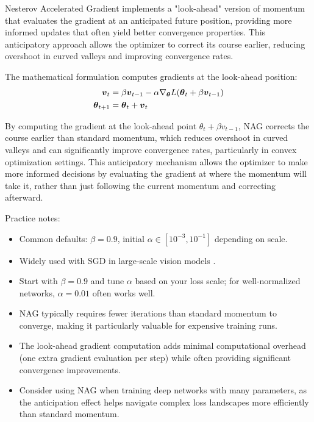 Nesterov Accelerated Gradient implements a "look-ahead" version of momentum that evaluates the gradient at an anticipated future position, providing more informed updates that often yield better convergence properties. This anticipatory approach allows the optimizer to correct its course earlier, reducing overshoot in curved valleys and improving convergence rates.

The mathematical formulation computes gradients at the look-ahead position:
\begin{align}
\boldsymbol{v}_t &= \beta \boldsymbol{v}_{t-1} - \alpha \nabla_{\boldsymbol{\theta}} L(\boldsymbol{\theta}_t + \beta \boldsymbol{v}_{t-1}) \\
\boldsymbol{\theta}_{t+1} &= \boldsymbol{\theta}_t + \boldsymbol{v}_t
\end{align}

By computing the gradient at the look-ahead point \(\theta_t+\beta v_{t-1}\), NAG corrects the course earlier than standard momentum, which reduces overshoot in curved valleys and can significantly improve convergence rates, particularly in convex optimization settings. This anticipatory mechanism allows the optimizer to make more informed decisions by evaluating the gradient at where the momentum will take it, rather than just following the current momentum and correcting afterward.\cite{Nesterov1983,WebOptimizationDLBook,GoodfellowEtAl2016}

Practice notes:
\begin{itemize}
    \item Common defaults: \(\beta=0.9\), initial \(\alpha\in[10^{-3},10^{-1}]\) depending on scale.
    \item Widely used with SGD in large-scale vision models \cite{He2016}.
    \item Start with \(\beta=0.9\) and tune \(\alpha\) based on your loss scale; for well-normalized networks, \(\alpha=0.01\) often works well.
    \item NAG typically requires fewer iterations than standard momentum to converge, making it particularly valuable for expensive training runs.
    \item The look-ahead gradient computation adds minimal computational overhead (one extra gradient evaluation per step) while often providing significant convergence improvements.
    \item Consider using NAG when training deep networks with many parameters, as the anticipation effect helps navigate complex loss landscapes more efficiently than standard momentum.
\end{itemize}

